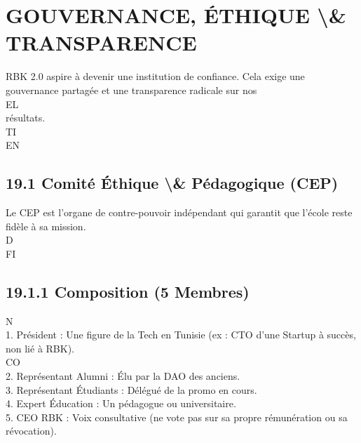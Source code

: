 \section{GOUVERNANCE, ÉTHIQUE \textbackslash{}& TRANSPARENCE}
\vspace{0.5em}
\vspace{0.5em}
RBK 2.0 aspire à devenir une institution de confiance. Cela exige une gouvernance partagée et une transparence radicale sur nos\\
\vspace{0.5em}
\vspace{0.5em}
\vspace{0.5em}
\vspace{0.5em}
EL\\
résultats.\\
\vspace{0.5em}
\vspace{0.5em}
\vspace{0.5em}
\vspace{0.5em}
TI\\
EN\\
\subsection{19.1 Comité Éthique \textbackslash{}& Pédagogique (CEP)}
Le CEP est l’organe de contre-pouvoir indépendant qui garantit que l’école reste fidèle à sa mission.\\
\vspace{0.5em}
\vspace{0.5em}
\vspace{0.5em}
\vspace{0.5em}
D\\
FI\\
\subsection{19.1.1 Composition (5 Membres)}
\vspace{0.5em}
N\\
1. Président : Une figure de la Tech en Tunisie (ex : CTO d’une Startup à succès, non lié à RBK).\\
CO\\
2. Représentant Alumni : Élu par la DAO des anciens.\\
\vspace{0.5em}
3. Représentant Étudiants : Délégué de la promo en cours.\\
\vspace{0.5em}
4. Expert Éducation : Un pédagogue ou universitaire.\\
\vspace{0.5em}
5. CEO RBK : Voix consultative (ne vote pas sur sa propre rémunération ou sa révocation).\\
\vspace{0.5em}
\vspace{0.5em}
